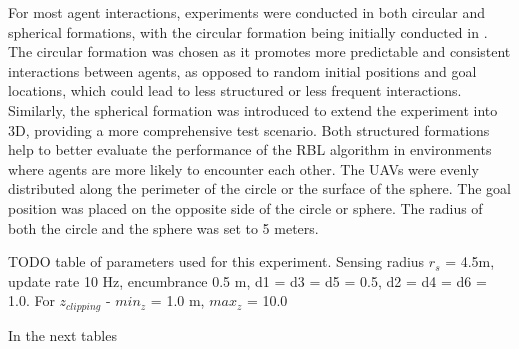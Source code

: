         For most agent interactions, experiments were conducted in both circular and spherical formations, with the circular formation being initially conducted in \cite{rbl_paper}. 
        The circular formation was chosen as it promotes more predictable and consistent interactions between agents, as opposed to random initial positions and goal locations, which could lead to less structured or less frequent interactions. 
        Similarly, the spherical formation was introduced to extend the experiment into 3D, providing a more comprehensive test scenario. 
        Both structured formations help to better evaluate the performance of the RBL algorithm in environments where agents are more likely to encounter each other.
        The UAVs were evenly distributed along the perimeter of the circle or the surface of the sphere. 
        The goal position was placed on the opposite side of the circle or sphere. 
        The radius of both the circle and the sphere was set to 5 meters.
        
        TODO table of parameters used for this experiment.
        Sensing radius $r_s$ = 4.5m, update rate 10 Hz, encumbrance 0.5 m, d1 = d3 = d5 = 0.5, d2 = d4 = d6 = 1.0.
        For $z_{clipping}$ - $min_z$ = 1.0 m, $max_z$ = 10.0


        In the next tables 
        
